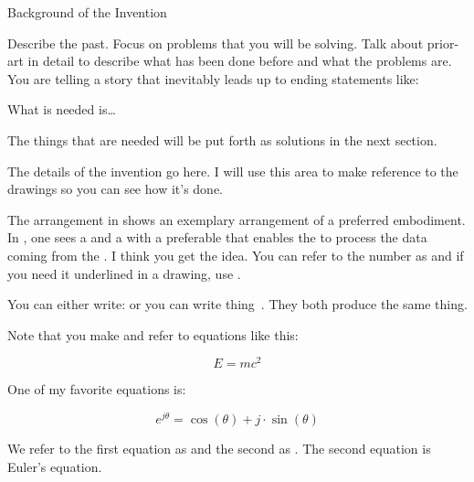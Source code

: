 \documentclass[english]{uspatent}
\begin{document}
\patentParagraph Background of the Invention

\patentParagraph Describe the past. Focus on problems that you will be solving. Talk about prior-art in detail to describe what has been done before and what the problems are. You are telling a story that inevitably leads up to ending statements like:

\patentParagraph What is needed is\ldots

\patentParagraph The things that are needed will be put forth as solutions in the next section.



\patentParagraph The details of the invention go here. I will use this area to make reference to the drawings so you can see how it's done.

\patentParagraph The arrangement in  shows an exemplary arrangement of a preferred embodiment. In , one sees a  and a  with a preferable  that enables the  to process the data coming from the . I think you get the idea.  You can refer to the number as  and if you need it underlined in a drawing, use .

\patentParagraph You can either write:  or you can write thing~. They both produce the same thing.

\patentParagraph Note that you make and refer to equations like this:

\begin{equation}
E=mc^{2}\label{eq:energy}
\end{equation}

\patentParagraph One of my favorite equations is:

\begin{equation}
e^{j\theta}=\cos\left(\theta\right)+j\cdot\sin\left(\theta\right)\label{eq:euler}
\end{equation}

\patentParagraph We refer to the first equation as  and the second as . The second equation  is Euler's equation.
\end{document}
